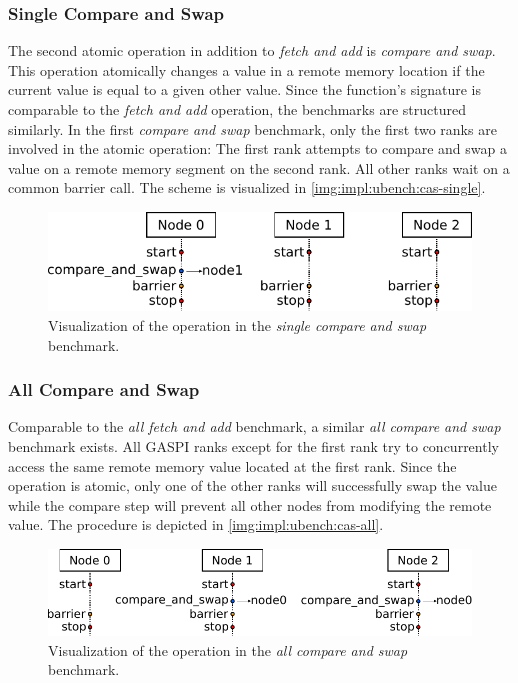 \subsubsection*{Single Compare and Swap}

The second atomic operation in addition to \emph{fetch and add} is \emph{compare and swap}. This operation atomically changes a value in a remote memory location if the current value is equal to a given other value. Since the function's signature is comparable to the \emph{fetch and add} operation, the benchmarks are structured similarly. In the first \emph{compare and swap} benchmark, only the first two ranks are involved in the atomic operation: The first rank attempts to compare and swap a value on a remote memory segment on the second rank. All other ranks wait on a common barrier call. The scheme is visualized in \autoref{img:impl:ubench:cas-single}. 

\begin{figure}[htb]
\centering
\includegraphics[width=\textwidth]{img/bench-atomic-cas-single}
\caption{Visualization of the operation in the \emph{single compare and swap} benchmark.}
\label{img:impl:ubench:cas-single}
\end{figure}


\subsubsection*{All Compare and Swap}

Comparable to the \emph{all fetch and add} benchmark, a similar \emph{all compare and swap} benchmark exists. All \ac{GASPI} ranks except for the first rank try to concurrently access the same remote memory value located at the first rank. Since the operation is atomic, only one of the other ranks will successfully swap the value while the compare step will prevent all other nodes from modifying the remote value. The procedure is depicted in \autoref{img:impl:ubench:cas-all}.

\begin{figure}[htb]
\centering
\includegraphics[width=\textwidth]{img/bench-atomic-cas-all}
\caption{Visualization of the operation in the \emph{all compare and swap} benchmark.}
\label{img:impl:ubench:cas-all}
\end{figure}


